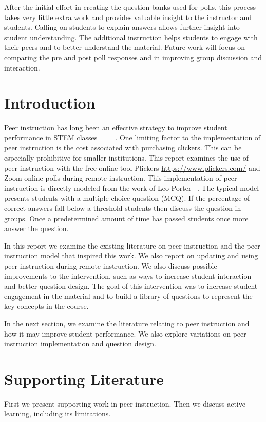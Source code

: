 \documentclass[12pt]{article}
\begin{document}
After the initial effort in creating the question banks used for polls, this process takes very little extra work and provides valuable insight to the instructor and students.  Calling on students to explain answers allows further insight into student understanding.  The  additional instruction helps students to engage with their peers and to better understand the material.  Future work will focus on comparing the pre and post poll responses and in improving group discussion and interaction.
 
\section{Introduction}
Peer instruction has long been an effective strategy to improve student performance in STEM classes ~\cite{porterMultiinstitutionalStudyPeer2016} ~\cite{porterHalvingFailRates2013} ~\cite{simonExperienceReportPeer2010a}. One limiting factor to the implementation of peer instruction is the cost associated with purchasing clickers.  This can be especially prohibitive for smaller institutions.  
This report examines the use of peer instruction with the free online tool Plickers \url{https://www.plickers.com/} and Zoom online polls during remote instruction.  
This implementation of peer instruction is directly modeled from the work of Leo Porter ~\cite{porterMultiinstitutionalStudyPeer2016}.  The typical model presents students with a multiple-choice question (MCQ). If the percentage of correct answers fall below a threshold students then discuss the question in groups. Once a predetermined amount of time has passed students once more answer the question.

In this report we examine the existing literature on peer instruction and the peer instruction model that inspired this work.  We also report on updating and using peer instruction during remote instruction.  We also discuss possible improvements to the intervention, such as ways to increase student interaction and better question design. The goal of this intervention was to increase student engagement in the material and to build a library of questions to represent the key concepts in the course. 

In the next section, we examine the literature relating to peer instruction and how it may improve student performance.  We also explore variations on peer instruction implementation and question design. 

\section{Supporting Literature}
First we present supporting work in peer instruction.  Then we discuss active learning, including its limitations. 
\end{document}
